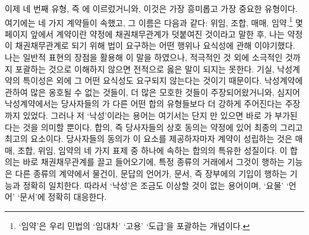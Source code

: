 이제 네 번째 유형, 즉 에 이르렀거니와,
이것은 가장 흥미롭고 가장 중요한 유형이다.
여기에는 네 가지 계약들이 속했고, 그 이름은 다음과 같다:
위임, 조합,
매매, 임약.\footnote{%
  `임약'은 우리 민법의 `임대차' `고용' `도급'을 포괄하는 개념이다.
  }
몇 페이지 앞에서
계약이란 약정에 채권채무관계가 덧붙여진 것이라고 말한 후,
나는
약정이 채권채무관계로 되기 위해 법이 요구하는
어떤 행위나 요식성에 관해 이야기했다.
나는 일반적 표현의 장점을 활용해 이 말을 하였으나,
적극적인 것 외에 소극적인 것까지 포괄하는 것으로 이해하지 않으면
전적으로 옳은 말이 되지는 못한다.
기실,
낙성계약의 특이성은  외에 그 어떤 요식성도
 요구되지 않는다는 것이기 때문이다.
낙성계약에 관하여 많은 옹호될 수 없는 것들이,
더 많은 모호한 것들이 주장되어왔거니와,
심지어 낙성계약에서는 당사자들의 가
다른 어떤 합의 유형들보다 더 강하게 주어진다는 주장까지 있었다.
그러나 저 `낙성'이라는 용어는
여기서는
단지 만 있으면 바로 가
부가된다는 것을 의미할 뿐이다.
합의, 즉 당사자들의 상호 동의는
약정에 있어 최종의 그리고 최고의 요소이다.
당사자들의 동의가 이 요소를 제공하자마자
 계약이 성립하는 것은
매매, 조합, 위임, 임약의 네 가지 표제 중 하나에 속하는
합의의 특유한 성질이다.
이 합의는 바로 채권채무관계를 끌고 들어오기에,
특정 종류의 거래에서 그것이 행하는 기능은
다른 종류의 계약에서 물건이, 문답의 언어가,
문서, 즉 장부에의 기입이 행하는 기능과 정확히 일치한다.
따라서 `낙성'은
조금도 이상할 것이 없는 용어이며,
`요물' `언어' `문서'에 정확히 대응한다.

